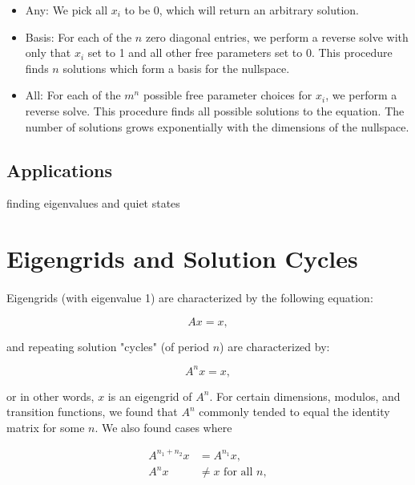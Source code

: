 \documentclass[11pt]{article}
\begin{document}
\begin{itemize}
\item Any: We pick all $x_i$ to be 0, which will return an arbitrary solution.
\item Basis: For each of the $n$ zero diagonal entries, we perform a reverse solve with only that $x_i$ set to 1 and all other free parameters set to 0.  This procedure finds $n$ solutions which form a basis for the nullspace.
\item All: For each of the $m^n$ possible free parameter choices for $x_i$, we perform a reverse solve.  This procedure finds all possible solutions to the equation.  The number of solutions grows exponentially with the dimensions of the nullspace.
\end{itemize}

\subsection*{Applications}
finding eigenvalues and quiet states



\section*{Eigengrids and Solution Cycles}

\paragraph{} Eigengrids (with eigenvalue 1) are characterized by the following equation:

\begin{equation}
Ax = x,
\end{equation}

\noindent and repeating solution "cycles" (of period $n$) are characterized by:

\begin{equation}
A^nx = x,
\end{equation}

\noindent or in other words, $x$ is an eigengrid of $A^n$. For certain dimensions, modulos, and transition functions, we found that $A^n$ commonly tended to equal the identity matrix for some $n$. We also found cases where

\begin{equation}
\begin{split}
  A^{n_1 + n_2}x & = A^{n_1}x,\\
  A^{n}x & \neq x \text{ for all } n,
\end{split}
\end{equation}
\end{document}
